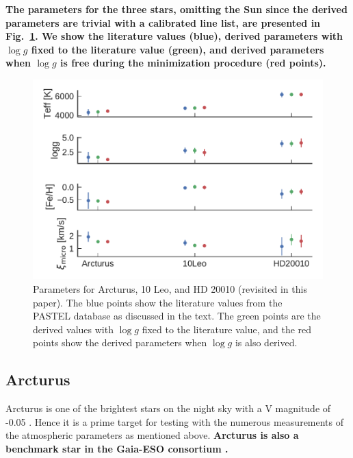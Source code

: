 \documentclass{aa}
\begin{document}
{\bf The parameters for the three stars, omitting the Sun since the derived
parameters are trivial with a calibrated line list, are presented in
Fig.~\ref{fig:parameters}. We show the literature values (blue), derived
parameters with $\log g$ fixed to the literature value (green), and derived
parameters when $\log g$ is free during the minimization procedure (red
points).}

\begin{figure}[htpb!]
    \centering
    \includegraphics[width=1.0\linewidth]{figures/parameters.pdf}
    \caption{Parameters for Arcturus, 10 Leo, and HD 20010 (revisited in this
             paper). The blue points show the literature values from the PASTEL
             database as discussed in the text. The green points are the
             derived values with $\log g$ fixed to the literature value, and the
             red points show the derived parameters when $\log g$ is also
             derived.}
    \label{fig:parameters}
\end{figure}


\subsection{Arcturus}
\label{sec:arcturus}

Arcturus is one of the brightest stars on the night sky with a V magnitude of
-0.05 \citep{Ducati2002}. Hence it is a prime target for testing with the
numerous measurements of the atmospheric parameters as mentioned above. {\bf
Arcturus is also a benchmark star in the Gaia-ESO consortium
\citep{Jofre2014,Smiljanic2014}.}
\end{document}
